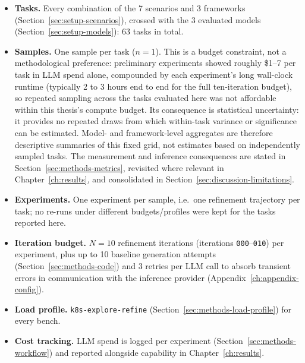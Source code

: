 \begin{itemize}
  \item \textbf{Tasks.} Every combination of the 7 scenarios and 3
        frameworks (Section~\ref{sec:setup-scenarios}), crossed with the 3
        evaluated models (Section~\ref{sec:setup-models}): 63 tasks in
        total.
  \item \textbf{Samples.} One sample per task ($n=1$). This is a budget
        constraint, not a methodological preference: preliminary
        experiments showed roughly \$1--7 per task in LLM spend alone,
        compounded by each experiment's long wall-clock runtime (typically
        2 to 3 hours end to end for the full ten-iteration budget), so
        repeated sampling across the tasks evaluated here was not
        affordable within this thesis's compute budget. Its consequence is
        statistical uncertainty: it provides no repeated draws from which
        within-task variance or significance can be estimated. Model- and
        framework-level aggregates are therefore descriptive summaries of
        this fixed grid, not estimates based on independently sampled tasks.
        The measurement and inference consequences are stated in
        Section~\ref{sec:methods-metrics}, revisited where relevant in
        Chapter~\ref{ch:results}, and consolidated in
        Section~\ref{sec:discussion-limitations}.
  \item \textbf{Experiments.} One experiment per sample, i.e.\ one
        refinement trajectory per task; no re-runs under different
        budgets/profiles were kept for the tasks reported here.
  \item \textbf{Iteration budget.} $N{=}10$ refinement iterations
        (iterations \texttt{000}--\texttt{010}) per experiment, plus up to
        10 baseline generation attempts (Section~\ref{sec:methods-code})
        and 3 retries per LLM call to absorb transient errors in
        communication with the inference provider
        (Appendix~\ref{ch:appendix-config}).
  \item \textbf{Load profile.} \texttt{k8s-explore-refine}
        (Section~\ref{sec:methods-load-profile}) for every bench.
  \item \textbf{Cost tracking.} LLM spend is logged per experiment
        (Section~\ref{sec:methods-workflow}) and reported alongside
        capability in Chapter~\ref{ch:results}.
\end{itemize}
